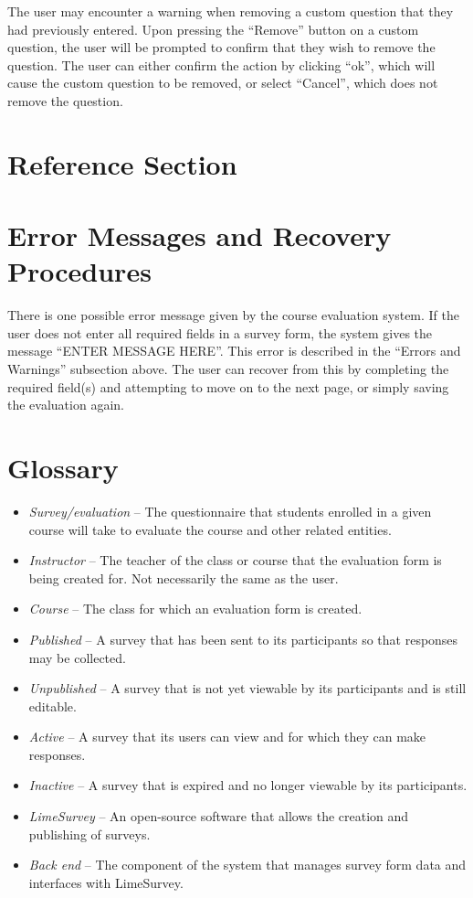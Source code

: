 \documentclass{article}
\begin{document}
The user may encounter a warning when removing a custom question that they had previously entered. Upon pressing the ``Remove'' button on a custom question, the user will be prompted to confirm that they wish to remove the question. The user can either confirm the action by clicking ``ok'', which will cause the custom question to be removed, or select ``Cancel'', which does not remove the question.

\section{Reference Section}



\section{Error Messages and Recovery Procedures}

There is one possible error message given by the course evaluation system. If the user does not enter all required fields in a survey form, the system gives the message ``ENTER MESSAGE HERE''. This error is described in the ``Errors and Warnings'' subsection above. The user can recover from this by completing the required field(s) and attempting to move on to the next page, or simply saving the evaluation again.

\appendix

\newpage

\section{Glossary}

\begin{itemize}
 \item \textit{Survey/evaluation} -- The questionnaire that students enrolled in a given course will take to evaluate the course and other related entities.
 \item \textit{Instructor} -- The teacher of the class or course that the evaluation form is being created for. Not necessarily the same as the user.
 \item \textit{Course} -- The class for which an evaluation form is created.
 \item \textit{Published} -- A survey that has been sent to its participants so that responses may be collected.
 \item \textit{Unpublished} -- A survey that is not yet viewable by its participants and is still editable.
 \item \textit{Active} -- A survey that its users can view and for which they can make responses.
 \item \textit{Inactive} -- A survey that is expired and no longer viewable by its participants.
 \item \textit{LimeSurvey} -- An open-source software that allows the creation and publishing of surveys.
 \item \textit{Back end} -- The component of the system that manages survey form data and interfaces with LimeSurvey.
\end{itemize}
\end{document}
